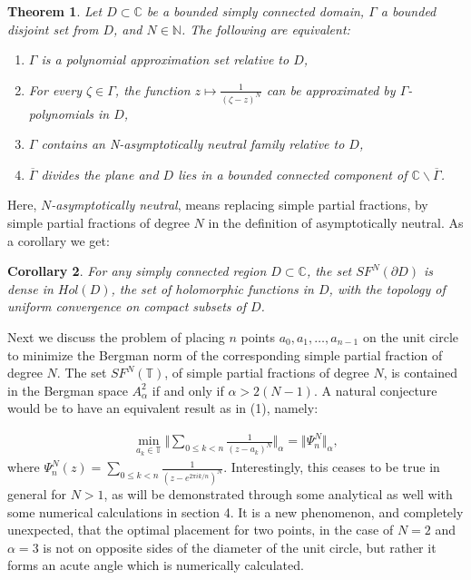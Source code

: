 \documentclass{amsart}[11pt]
\newcommand{\C}{\mathbb{C}} %
\newcommand{\N}{\mathbb{N}} %
\newcommand{\T}{\mathbb{T}} %
\newcommand{\sbs}{\subset} %
\newcommand{\no}[1]{\Vert #1 \Vert} %
\newtheorem{theorem}{Theorem}[section]
\newtheorem{corollary}[theorem]{Corollary}
\theoremstyle{definition}
\begin{document}
\begin{theorem}
     Let $D \sbs \C$ be a bounded simply connected domain,  $\Gamma$ a bounded disjoint set from $D$, and $N \in \N$. The following are equivalent:
\begin{enumerate}[label= (\roman*)]
    \item $\Gamma$ is a polynomial approximation set relative to $D$,
    \item For every $\zeta \in \Gamma$, the function $z \mapsto \frac{1}{(\zeta -z)^N}$ can be approximated by $\Gamma$-polynomials in $D$,
    \item $\Gamma$ contains an N-asymptotically neutral family relative to $D$,
    \item $\overline{\Gamma}$ divides the plane and $D$ lies in a bounded connected component of $\C \backslash \overline{\Gamma}$.
\end{enumerate}     
\end{theorem}

Here, \textit{$N$-asymptotically neutral}, means replacing simple partial fractions, by simple partial fractions of degree $N$ in the definition of asymptotically neutral. As a corollary we get:

\begin{corollary}
 For any simply connected region $D \sbs \C$, the set $SF^N(\partial D)$ is dense in $Hol(D)$, the set of holomorphic functions in $D$, with the topology of uniform convergence on compact subsets of $D$.
\end{corollary}

Next we discuss the problem of placing $n$ points $a_0, a_1, \ldots, a_{n-1}$ on the unit circle to minimize the Bergman norm of the corresponding simple partial fraction of degree $N$. The set $SF^N(\T)$, of simple partial fractions of degree $N$, is contained in the Bergman space $A^2_{\alpha}$ if and only if $\alpha > 2(N-1)$. A natural conjecture would be to have an equivalent result as in (1), namely:

\begin{gather}
    \min_{a_k \in \T} \bigg \Vert \sum_{0 \leq k < n}\frac{1}{(z-a_k)^N} \bigg \Vert_{\alpha} = \no{\Psi_n^N}_{\alpha},
\end{gather}
where $\Psi_n^N(z) = \sum_{0 \leq k <n} \frac{1}{(z-e^{2 \pi i k/n})^N}$. Interestingly, this ceases to be true in general for $N>1$, as will be demonstrated through some analytical as well with some numerical calculations in section 4. It is a new phenomenon, and completely unexpected, that the optimal placement for two points, in the case of $N=2$ and $\alpha = 3$ is not on opposite sides of the diameter of the unit circle, but rather it forms an acute angle which is numerically calculated.
\end{document}

